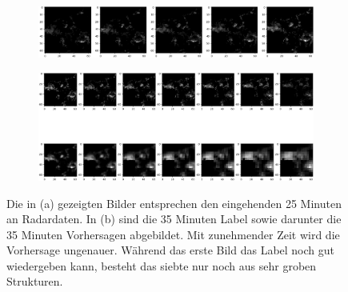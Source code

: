 \begin{figure}[]
	\centering
	\begin{subfigure}[]{0.9\linewidth} 
		\centering
		\includegraphics[width=\linewidth]{pics/dt2}
		\caption[]{}\label{fa}
	\end{subfigure}
	
	\begin{subfigure}[]{\linewidth} 
		\centering
		\includegraphics[width=\linewidth]{pics/t2}
		\caption[]{}\label{fb}
	\end{subfigure}
	
	\caption[Validierungsdaten und Label sowie Vorhersage 1]{Die in (a) gezeigten Bilder entsprechen den eingehenden 25 Minuten an Radardaten. In (b) sind die 35 Minuten Label sowie darunter die 35 Minuten Vorhersagen abgebildet. Mit zunehmender Zeit wird die Vorhersage ungenauer. Während das erste Bild das Label noch gut wiedergeben kann, besteht das siebte nur noch aus sehr groben Strukturen.}
	\label{vieleBilder1}
\end{figure}

